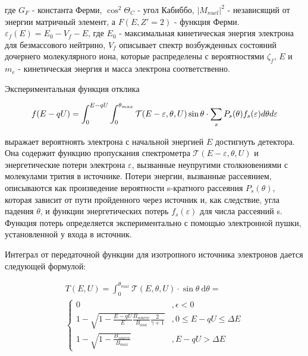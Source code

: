 \documentclass[a4paper,14pt]{extarticle}
\begin{document}
    \noindent где $G_F$ - константа Ферми, $\cos^2 \Theta_C$ - угол Кабиббо, $|M_{nucl}|^2$ - независящий от энергии матричный
    элемент, а $F(E, Z'=2)$ - функция Ферми. $\varepsilon_f(E) = E_0 - V_f - E$, где $E_0$ - максимальная кинетическая
    энергия электрона для безмассового нейтрино, $V_f$ описывает спектр возбужденных состояний дочернего молекулярного иона, которые распределены с
    вероятностями $\zeta_f$, $E$ и $m_e$ - кинетическая энергия и масса электрона соответственно.
    
    Экспериментальная функция отклика
    
    \begin{equation}
      f(E-qU) = \int_0^{E-qU} \int_0^{\theta_{max}} \mathcal T(E - \varepsilon, \theta, U) \sin\theta \\
      \cdot \displaystyle\sum_s P_s(\theta)f_s(\varepsilon) d\theta d\varepsilon
    \end{equation}
    
    \noindent выражает вероятноять электрона с начальной энергией $E$ достигнуть детектора. Она содержит функцию 
    пропускания спектрометра $\mathcal T(E - \varepsilon, \theta, U)$ и энергетические потери электрона
    $\varepsilon$, вызванные неупругими столкновениями с молекулами трития в источнике. Потери энергии, вызванные
    рассеянием, описываются как произведение вероятности s-кратного рассеяния $P_s(\theta)$, которая зависит от пути 
    пройденного через источник и, как следствие, угла падения $\theta$, и функции энергетических потерь 
    $f_s(\varepsilon)$ для числа рассеяний s. Функция потерь определяется экспериментально с помощью электронной
    пушки, установленной у входа в источник.
    
    Интеграл от передаточной функции для изотропного источника электронов дается следующей формулой: 
      
    \begin{align}
      T(E,U) = \int_0^{\theta_{max}} \mathcal T(E, \theta, U) \cdot \sin \theta \: \mathrm d \theta = \\
      \begin{cases} 
        0 & , \epsilon < 0 \\
        1 - \sqrt{1-\frac{E-qU}{E} \frac{B_{source}}{B_{ana}} \frac{2}{\gamma + 1}} & , 0 \leq E-qU \leq \Delta E \\
        1 - \sqrt{1-\frac{B_{source}}{B_{max}}} & , E - qU > \Delta E
      \end{cases}
    \end{align}
    
\end{document}
